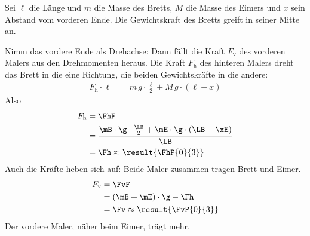 Sei $\ell$ die Länge und $m$ die Masse des Bretts, $M$ die Masse des Eimers und $x$ sein Abstand vom vorderen Ende. Die Gewichtskraft des Bretts greift in seiner Mitte an.

Nimm das vordere Ende als Drehachse: Dann fällt die Kraft $F_\mathrm{v}$ des vorderen Malers aus den Drehmomenten heraus. Die Kraft $F_\mathrm{h}$ des hinteren Malers dreht das Brett in die eine Richtung, die beiden Gewichtskräfte in die andere:
\begin{align}
 F_\mathrm{h}\cdot\ell &= m\,g\cdot\frac{\ell}{2} + M\,g\cdot(\ell-x)
\end{align}
Also
\begin{align}
 F_\mathrm{h} &= \FhF \\
   &= \frac{\mB\cdot\g\cdot\frac{\LB}{2}+\mE\cdot\g\cdot(\LB-\xE)}{\LB} \\
   &= \Fh \approx \result{\FhP{0}{3}}
\end{align}
Auch die Kräfte heben sich auf: Beide Maler zusammen tragen Brett und Eimer.
\begin{align}
 F_\mathrm{v} &= \FvF \\
   &= (\mB+\mE)\cdot\g-\Fh \\
   &= \Fv \approx \result{\FvP{0}{3}}
\end{align}
Der vordere Maler, näher beim Eimer, trägt mehr.
